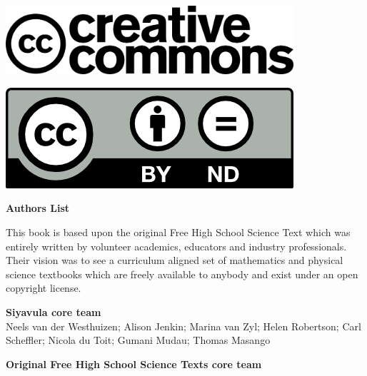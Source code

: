\vspace*{4in}

\begin{center}
\begin{minipage}{0.6\textwidth}
\includegraphics[width=0.8\textwidth]{title_images/cc2.png}
\end{minipage}
\begin{minipage}{0.3\textwidth}
\includegraphics[width=0.8\textwidth]{title_images/cc1.png}
\end{minipage}
\end{center}







\newpage
\thispagestyle{empty}


\begin{flushleft} \textbf{\huge Authors List} \end{flushleft}

{\LARGE This book is based upon the original Free High School Science Text which was entirely written by
volunteer academics, educators and industry professionals. Their vision was to see a curriculum aligned
set of mathematics and physical science textbooks which are freely available to anybody and exist
under an open copyright license.} \par

\textbf{\LARGE Siyavula core team} \\

Neels van der Westhuizen; Alison Jenkin; Marina van Zyl; Helen Robertson; Carl Scheffler; Nicola du Toit; Gumani Mudau; Thomas Masango \par

\textbf{\LARGE Original Free High School Science Texts core team}\\

